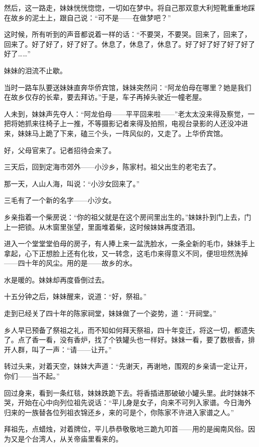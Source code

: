 \par 然后，这一路走，妹妹恍恍惚惚，一切如在梦中。将自己那双意大利短靴重重地踩在故乡的泥土上，跟自己说：“可不是——在做梦吧？”
\par 这时候，所有听到的声音都说着一样的话：“不要哭，不要哭。回来了，回来了，回来了。好了好了，好了好了。休息了，休息了，休息了。好了好了好了好了好了好了……”
\par 妹妹的泪流不止歇。
\par 当时一路车队要送妹妹直奔华侨宾馆，妹妹突然问：“阿龙伯母在哪里？她是我们在故乡仅存的长辈，要去拜访。”于是，车子再掉头驶近一幢老屋。
\par 人未到，妹妹声先夺人：“阿龙伯母——平平回来啦——”老太太没来得及察觉，一把将她抓来往椅子上一推，不等摄影记者来得及拍照，电视台录影的人还没冲进来，妹妹马上跪了下来，磕三个头，一阵风似的，又走了。上华侨宾馆。
\par 好，父母官来了。记者招待会来了。
\par 三天后，回到定海市郊外——小沙乡，陈家村。祖父出生的老宅去了。
\par 那一天，人山人海，叫说：“小沙女回来了。”
\par 三毛有了一个新的名字——小沙女。
\par 乡亲指着一个柴房说：“你的祖父就是在这个房间里出生的。”妹妹扑到门上去，门上一把锁。从木窗里张望，里面堆着柴，这时候妹妹再度洒泪。
\par 进入一个堂堂堂伯母的房子，有人捧上来一盆洗脸水，一条全新的毛巾，妹妹手上拿起，心下正想脸上还有化妆，又一转念，这毛巾来得意义不同，便坦坦然洗掉——四十年的风尘。用的是——故乡的水。
\par 水是暖的。妹妹却再度昏倒过去。
\par 十五分钟之后，妹妹醒来，说道：“好，祭祖。”
\par 走到已经关了四十年的陈家祠堂，妹妹做了一个姿势，道：“开祠堂。”
\par 乡人早已预备了祭祖之礼，而不知如何拜天祭祖，四十年变迁，将这一切，都遗失了。点了香一看，没有香炉，找了个铁罐头也一样好。妹妹一看，要了数根香，排开人群，叫了一声：“请——让开。”
\par 转过头来，对着天空，妹妹大声道：“先谢天，再谢地，围观的乡亲请一定让开，你们——当不起。”
\par 回过身来，看到一条红毯，妹妹跌跪下去。将香插进那破破小罐头里。此时妹妹不哭，开始在心中向列位祖先说话：“平儿身是女子，向来不可列入家谱。今日海外归来的一族替各位列祖衣锦还乡，来的可是个，你陈家不许进入家谱之人。”
\par 拜祖先，点蜡烛，对着牌位，平儿恭恭敬敬地三跪九叩首——用的是闽南风俗。因为又是个台湾人，从关帝庙里看来的。
